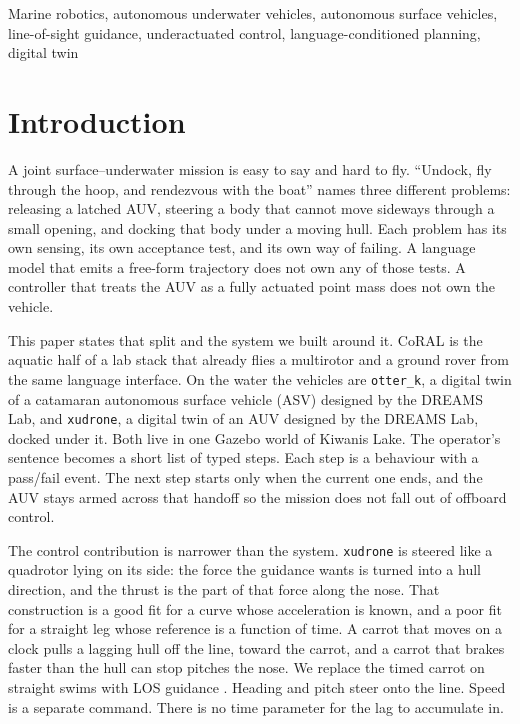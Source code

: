 \documentclass[conference]{IEEEtran}
\def\CoRAL{CoRAL}
\def\otterk{\texttt{otter\_k}}
\def\xudrone{\texttt{xudrone}}
\begin{document}
\begin{IEEEkeywords}
Marine robotics, autonomous underwater vehicles, autonomous surface vehicles, line-of-sight guidance, underactuated control, language-conditioned planning, digital twin
\end{IEEEkeywords}

\section{Introduction}
\label{sec:intro}

A joint surface--underwater mission is easy to say and hard to fly. ``Undock, fly through the hoop, and rendezvous with the boat'' names three different problems: releasing a latched AUV, steering a body that cannot move sideways through a small opening, and docking that body under a moving hull. Each problem has its own sensing, its own acceptance test, and its own way of failing. A language model that emits a free-form trajectory does not own any of those tests. A controller that treats the AUV as a fully actuated point mass does not own the vehicle.

This paper states that split and the system we built around it. \CoRAL{} is the aquatic half of a lab stack that already flies a multirotor and a ground rover from the same language interface. On the water the vehicles are \otterk{}, a digital twin of a catamaran autonomous surface vehicle (ASV) designed by the DREAMS Lab, and \xudrone{}, a digital twin of an AUV designed by the DREAMS Lab, docked under it. Both live in one Gazebo world of Kiwanis Lake. The operator's sentence becomes a short list of typed steps. Each step is a behaviour with a pass/fail event. The next step starts only when the current one ends, and the AUV stays armed across that handoff so the mission does not fall out of offboard control.

The control contribution is narrower than the system. \xudrone{} is steered like a quadrotor lying on its side: the force the guidance wants is turned into a hull direction, and the thrust is the part of that force along the nose. That construction is a good fit for a curve whose acceleration is known, and a poor fit for a straight leg whose reference is a function of time. A carrot that moves on a clock pulls a lagging hull off the line, toward the carrot, and a carrot that brakes faster than the hull can stop pitches the nose. We replace the timed carrot on straight swims with LOS guidance \cite{fossen2011,lekkas2014}. Heading and pitch steer onto the line. Speed is a separate command. There is no time parameter for the lag to accumulate in.
\end{document}
